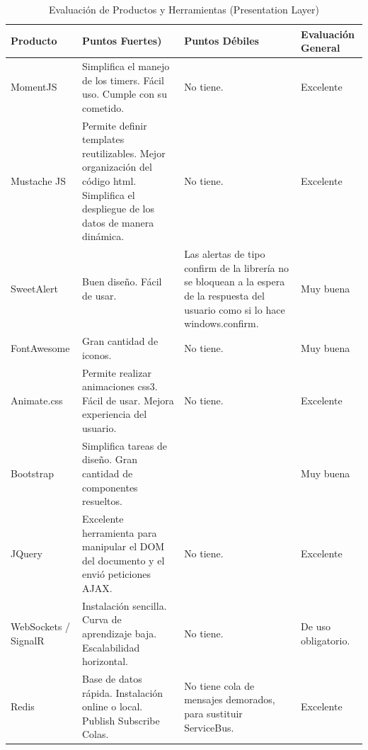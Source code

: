 \documentclass[journal]{IEEEtran}
\begin{document}
\begin{table}

\begin{center}
    \begin{tabular}{| p{1.5cm} | p{2cm} | p{2cm} | p{1.5cm} |}
    \hline
    \textbf{Producto} & 
    \textbf{Puntos Fuertes)} & 
    \textbf{Puntos Débiles} & 
    \textbf{Evaluación General} \\ \hline
    
    MomentJS &
    Simplifica el manejo de los timers. Fácil uso. Cumple con su cometido. &
    No tiene. &
    Excelente  \\ \hline
    
    Mustache JS & 
    Permite definir templates reutilizables. Mejor organización del código html. Simplifica el despliegue de los datos de manera dinámica. &
    No tiene. &
    Excelente \\ \hline
    
    SweetAlert &
    Buen diseño. Fácil de usar. &
    Las alertas de tipo confirm de la librería no se bloquean a la espera de la respuesta del usuario como si lo hace windows.confirm. &
    Muy buena \\ \hline
    
    FontAwesome &
    Gran cantidad de iconos. &
    No tiene. &
    Muy buena \\ \hline
    
    Animate.css &
    Permite realizar animaciones css3. Fácil de usar. Mejora experiencia del usuario. &
    No tiene. &
    Excelente \\ \hline
    
    Bootstrap &
    Simplifica tareas de diseño. Gran cantidad de componentes resueltos. &
     &
    Muy buena \\ \hline
    
    JQuery &
    Excelente herramienta para manipular el DOM del documento y el envió peticiones AJAX. &
    No tiene. &
    Excelente \\ \hline
    
    WebSockets / SignalR &
    Instalación sencilla. Curva de aprendizaje baja. Escalabilidad horizontal. &
    No tiene. &
    De uso obligatorio. \\ \hline
    
    Redis &
    Base de datos rápida. Instalación online o local. Publish Subscribe Colas.&
    No tiene cola de mensajes demorados, para sustituir ServiceBus. &
    Excelente \\ \hline
    
    
    
    \end{tabular}
\end{center}
    \caption{Evaluación de Productos y Herramientas  (Presentation Layer)}
    \label{tabla:pres}
\end{table}
\end{document}
